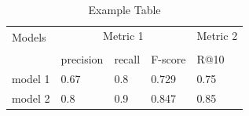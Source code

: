 \documentclass{article}
\begin{document}
\begin{table}[h]
    \centering
    \label{tab:example-table}
    \caption{Example Table}
    \begin{tabular}{lllll}
        \toprule
        \multirow{2}{*}{Models} & \multicolumn{3}{c}{Metric 1} & Metric 2\\
        \cmidrule{2-4} \cmidrule{5-5} \\
        {} & precision & recall & F-score  & R@10 \\
        \midrule
        model 1 & 0.67  & 0.8 & 0.729  & 0.75 \\
        model 2 & 0.8 & 0.9 & 0.847 & 0.85 \\
        \bottomrule
    \end{tabular}
\end{table}



\end{document}
